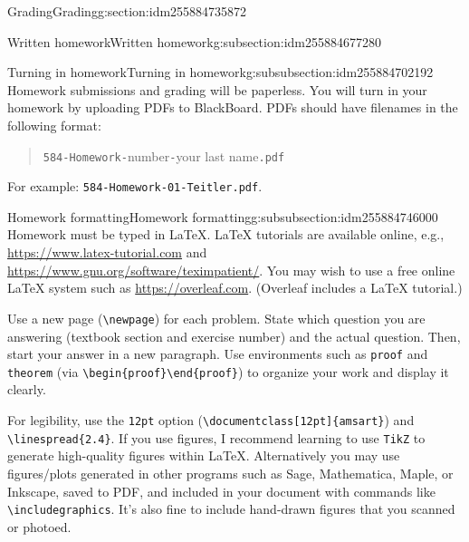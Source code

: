 \documentclass[oneside,10pt,]{article}
\newcommand{\mono}[1]{\texttt{#1}}
\begin{document}
\begin{sectionptx}{Grading}{}{Grading}{}{}{g:section:idm255884735872}
\begin{subsectionptx}{Written homework}{}{Written homework}{}{}{g:subsection:idm255884677280}
\begin{subsubsectionptx}{Turning in homework}{}{Turning in homework}{}{}{g:subsubsection:idm255884702192}
Homework submissions and grading will be paperless. You will turn in your homework by uploading PDFs to BlackBoard. PDFs should have filenames in the following format: \begin{quote}%
\mono{584-Homework-}\textlangle{}number\textrangle{}\mono{-}\textlangle{}your last name\textrangle{}\mono{.pdf}\end{quote}
 For example: \mono{584-Homework-01-Teitler.pdf}.%
\end{subsubsectionptx}
%
%
\typeout{************************************************}
\typeout{************************************************}
%
\begin{subsubsectionptx}{Homework formatting}{}{Homework formatting}{}{}{g:subsubsection:idm255884746000}
Homework must be typed in \LaTeX{}. \LaTeX{} tutorials are available online, e.g., \url{https://www.latex-tutorial.com} and \url{https://www.gnu.org/software/teximpatient/}. You may wish to use a free online \LaTeX{} system such as \url{https://overleaf.com}. (Overleaf includes a \LaTeX{} tutorial.)%
\par
Use a new page (\mono{\textbackslash{}newpage}) for each problem. State which question you are answering (textbook section and exercise number) and the actual question. Then, start your answer in a new paragraph. Use environments such as \mono{proof} and \mono{theorem} (via \mono{\textbackslash{}begin\{proof\}}\textellipsis{}\mono{\textbackslash{}end\{proof\}}) to organize your work and display it clearly.%
\par
For legibility, use the \mono{12pt} option (\mono{\textbackslash{}documentclass[12pt]\{amsart\}}) and \mono{\textbackslash{}linespread\{2.4\}}. If you use figures, I recommend learning to use \mono{TikZ} to generate high-quality figures within \LaTeX{}. Alternatively you may use figures\slash{}plots generated in other programs such as Sage, Mathematica, Maple, or Inkscape, saved to PDF, and included in your document with commands like \mono{\textbackslash{}includegraphics}. It's also fine to include hand-drawn figures that you scanned or photoed.%
\end{subsubsectionptx}
\end{subsectionptx}
\end{sectionptx}
%
%
\typeout{************************************************}
\typeout{************************************************}
%
\end{document}
